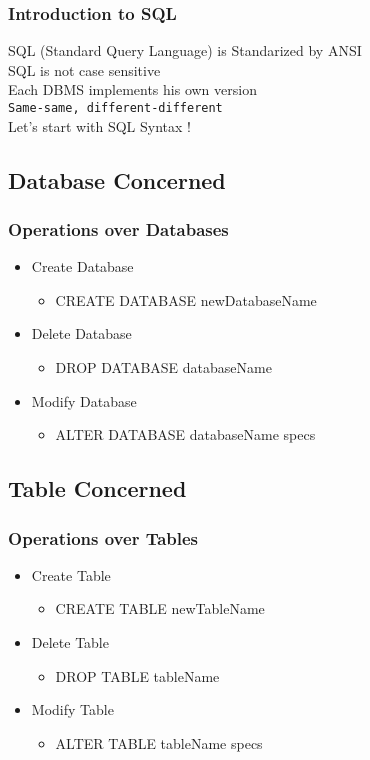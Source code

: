 	\begin{frame}
		\frametitle{Introduction to SQL}
		SQL (Standard Query Language) is Standarized by ANSI \\\pause
		SQL is not case sensitive \\\pause
		Each DBMS implements his own version \\\pause
		{\tt Same-same, different-different} \\\pause
		Let's start with SQL Syntax !
	\end{frame}

	\subsection{Database Concerned}
	\begin{frame}
		\frametitle{Operations over Databases}
			\begin{itemize}[<+->]
			 	\item Create Database
			 	\begin{itemize}
			 		\item CREATE DATABASE newDatabaseName
			 	\end{itemize}
			 	\item Delete Database
			 	\begin{itemize}
			 		\item DROP DATABASE databaseName
			 	\end{itemize}
			 	\item Modify Database
			 	\begin{itemize}
			 		\item ALTER DATABASE databaseName specs
			 	\end{itemize}
			\end{itemize}
	\end{frame}

	\subsection{Table Concerned}
	\begin{frame}
	 	\frametitle{Operations over Tables}
	 	\begin{itemize}[<+->]
	 		\item Create Table
	 		\begin{itemize}
	 			\item CREATE TABLE newTableName
	 		\end{itemize} 		
	 		\item Delete Table
	 		\begin{itemize}
		 		\item DROP TABLE tableName
			\end{itemize}
	 		\item Modify Table
	 		\begin{itemize}
	 			\item ALTER TABLE tableName specs
			\end{itemize}
	 	\end{itemize}
	\end{frame}

